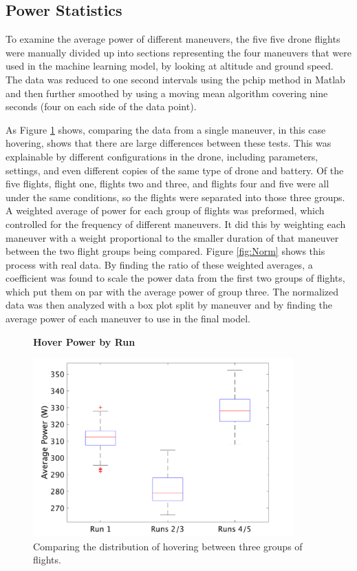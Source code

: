 \documentclass{article}
\begin{document}
\subsection{Power Statistics}
To examine the average power of different maneuvers, the five five drone flights were manually divided up into sections representing the four maneuvers that were used in the machine learning model, by looking at altitude and ground speed. The data was reduced to one second intervals using the pchip method in Matlab and then further smoothed by using a moving mean algorithm covering nine seconds (four on each side of the data point).\par

As Figure \ref{fig:hover} shows, comparing the data from a single maneuver, in this case hovering, shows that there are large differences between these tests. This was explainable by different configurations in the drone, including parameters, settings, and even different copies of the same type of drone and battery. Of the five flights, flight one, flights two and three, and flights four and five were all under the same conditions, so the flights were separated into those three groups. A weighted average of power for each group of flights was preformed, which controlled for the frequency of different maneuvers. It did this by weighting each maneuver with a weight proportional to the smaller duration of that maneuver between the two flight groups being compared. Figure  \ref{fig:Norm} shows this process with real data. By finding the ratio of these weighted averages, a coefficient was found to scale the power data from the first two groups of flights, which put them on par with the average power of group three. The normalized data was then analyzed with a box plot split by maneuver and by finding the average power of each maneuver to use in the final model.\par

\begin{figure}[!h]
  \centering
  \large{\textbf{Hover Power by Run}}\par
  \includegraphics[width = 100mm]{images/HoverPlain.png}
  \caption{Comparing the distribution of hovering between three groups of flights.}
  \label{fig:hover}
\end{figure}
\end{document}
